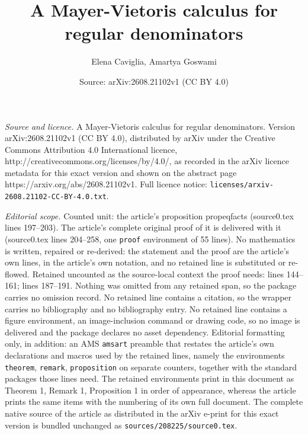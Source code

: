 \documentclass[10pt,a4paper]{amsart}
\title{A Mayer-Vietoris calculus for regular denominators}
\author{Elena Caviglia, Amartya Goswami}
\date{Source: arXiv:2608.21102v1 (CC BY 4.0)}
\begin{document}
\maketitle

\noindent\emph{Source and licence.} A Mayer-Vietoris calculus for regular denominators. Version arXiv:2608.21102v1 (CC BY 4.0), distributed by arXiv under the Creative Commons Attribution 4.0 International licence, http://creativecommons.org/licenses/by/4.0/, as recorded in the arXiv licence metadata for this exact version and shown on the abstract page https://arxiv.org/abs/2608.21102v1. Full licence notice: \texttt{licenses/arxiv-2608.21102-CC-BY-4.0.txt}.\par\smallskip

\noindent\textit{Editorial scope.} Counted unit: the article's proposition propeqfacts (source0.tex lines 197--203). The article's complete original proof of it is delivered with it (source0.tex lines 204--258, one \texttt{proof} environment of 55 lines). No mathematics is written, repaired or re-derived: the statement and the proof are the article's own lines, in the article's own notation, and no retained line is substituted or re-flowed.  Retained uncounted as the source-local context the proof needs: lines 144--161; lines 187--191.  Nothing was omitted from any retained span, so the package carries no omission record.  No retained line contains a citation, so the wrapper carries no bibliography and no bibliography entry.  No retained line contains a figure environment, an image-inclusion command or drawing code, so no image is delivered and the package declares no asset dependency.  Editorial formatting only, in addition: an AMS \texttt{amsart} preamble that restates the article's own declarations and macros used by the retained lines, namely the environments \texttt{theorem}, \texttt{remark}, \texttt{proposition} on separate counters, together with the standard packages those lines need.  The retained environments print in this document as Theorem 1, Remark 1, Proposition 1 in order of appearance, whereas the article prints the same items with the numbering of its own full document.  The complete native source of the article as distributed in the arXiv e-print for this exact version is bundled unchanged as \texttt{sources/208225/source0.tex}.
\end{document}

